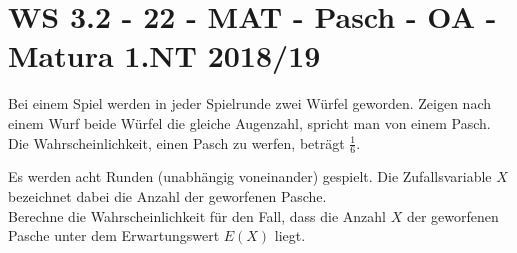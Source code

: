 \section{WS 3.2 - 22 - MAT - Pasch - OA - Matura 1.NT 2018/19}

\begin{beispiel}[WS 3.2]{1}
Bei einem Spiel werden in jeder Spielrunde zwei Würfel geworden. Zeigen nach einem Wurf beide Würfel die gleiche Augenzahl, spricht man von einem Pasch. Die Wahrscheinlichkeit, einen Pasch zu werfen, beträgt $\frac{1}{6}$.

Es werden acht Runden (unabhängig voneinander) gespielt. Die Zufallsvariable $X$ bezeichnet dabei die Anzahl der geworfenen Pasche.\\
Berechne die Wahrscheinlichkeit für den Fall, dass die Anzahl $X$ der geworfenen Pasche unter dem Erwartungswert $E(X)$ liegt.

\end{beispiel}